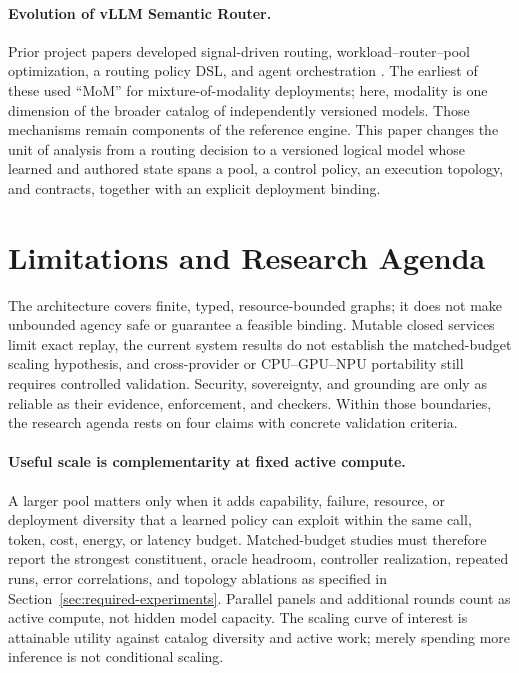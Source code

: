 \paragraph{Evolution of vLLM Semantic Router.}
Prior project papers developed signal-driven routing, workload--router--pool
optimization, a routing policy DSL, and agent orchestration
\citep{liu_2026_semanticrouter,chen_2026_wrp,liu_2026_conflictfree,chen_2026_orchestration}.
The earliest of these used ``MoM'' for mixture-of-modality deployments; here,
modality is one dimension of the broader catalog of independently versioned
models. Those mechanisms remain components of the reference engine. This paper
changes the unit of analysis from a routing decision to a versioned logical
model whose learned and authored state spans a pool, a control policy, an execution
topology, and contracts, together with an explicit deployment binding.

\section{Limitations and Research Agenda}
\label{sec:limitations}

The architecture covers finite, typed, resource-bounded graphs; it does not
make unbounded agency safe or guarantee a feasible binding. Mutable closed
services limit exact replay, the current system results do not establish the
matched-budget scaling hypothesis, and cross-provider or CPU--GPU--NPU portability
still requires controlled validation. Security, sovereignty, and grounding are
only as reliable as their evidence, enforcement, and checkers. Within those
boundaries, the research agenda rests on four claims with concrete validation
criteria.

\paragraph{Useful scale is complementarity at fixed active compute.}
A larger pool matters only when it adds capability, failure, resource, or
deployment diversity that a learned policy can exploit within the same call,
token, cost, energy, or latency budget. Matched-budget studies must therefore
report the strongest constituent,
oracle headroom, controller realization, repeated runs, error correlations, and
topology ablations as specified in Section~\ref{sec:required-experiments}.
Parallel panels and additional rounds count as active compute, not hidden model
capacity. The scaling curve of interest is attainable utility against catalog
diversity and active work; merely spending more inference is not conditional
scaling.

